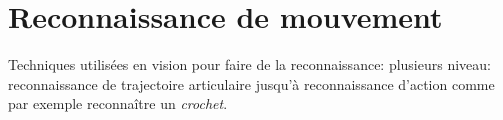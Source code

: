 \section{Reconnaissance de mouvement}
\label{chap:basics:sec:reco}

Techniques utilis\'ees en vision pour faire de la reconnaissance:
plusieurs niveau: reconnaissance de trajectoire articulaire
jusqu'\`a reconnaissance d'action comme par exemple reconna\^itre un \emph{crochet}.
